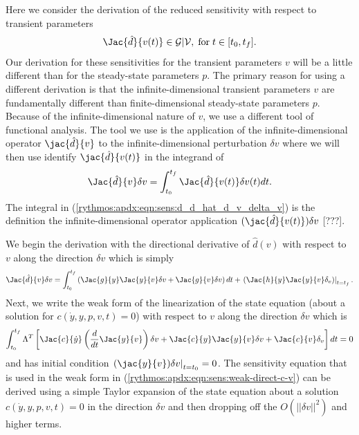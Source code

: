 \documentclass[pdf,ps2pdf,11pt]{SANDreport}
\begin{document}
Here we consider the derivation of the reduced sensitivity with respect to
transient parameters
%
\begin{equation}
\Jac{\hat{d}}{v(t)} \in \mathcal{G}|\mathcal{V}, \; \mbox{for} \; t\in[t_0,t_f].
\end{equation}
%
Our derivation for these sensitivities for the transient parameters $v$ will
be a little different than for the steady-state parameters $p$.  The primary
reason for using a different derivation is that the infinite-dimensional
transient parameters $v$ are fundamentally different than finite-dimensional
steady-state parameters $p$.  Because of the infinite-dimensional nature of
$v$, we use a different tool of functional analysis.  The tool we use is the
application of the infinite-dimensional operator $\jac{\hat{d}}{v}$ to the
infinite-dimensional perturbation $\delta v$ where we will then use identify
$\jac{\hat{d}}{v(t)}$ in the integrand of
%
\begin{equation}
\Jac{\hat{d}}{v} \delta v = \int_{t_0}^{t_f} \Jac{\hat{d}}{v(t)} \delta v(t) dt.
\label{rythmos:apdx:eqn:sens:d_d_hat_d_v_delta_v}
\end{equation}
%
The integral in (\ref{rythmos:apdx:eqn:sens:d_d_hat_d_v_delta_v}) is the
definition the infinite-dimensional operator application
$(\jac{\hat{d}}{v(t)}) {}\delta v$ [???].

We begin the derivation with the directional derivative of $\hat{d}(v)$ with
respect to $v$ along the direction $\delta v$ which is simply
%
\begin{equation}
\Jac{\hat{d}}{v} \delta v
= \int_{t_0}^{t_f} \left( \Jac{g}{y} \Jac{y}{v} \delta v +  \Jac{g}{v} \delta v \right) dt
+ \left. \left(  \Jac{h}{y} \Jac{y}{v} \delta_v \right) \right|_{t=t_f}.
\label{rythmos:apdx:eqn:sens:d_d_hat_d_v_delta_v-2}
\end{equation}
%
Next, we write the weak form of the linearization of the state equation (about
a solution for $c(\dot{y},y,p,v,t)=0$) with respect to $v$ along the direction
$\delta v$ which is
%
\begin{equation}
%
\int_{t_0}^{t_f} \Lambda^T \left[
\Jac{c}{\dot{y}} \left(\frac{d}{dt} \Jac{y}{v} \right) \delta v + \Jac{c}{y} \Jac{y}{v} \delta v
+ \Jac{c}{v} \delta_v \right] dt = 0
\label{rythmos:apdx:eqn:sens:weak-direct-c-v}
\end{equation}
%
and has initial condition $\left.(\jac{y}{v})\delta v\right|_{t=t_0} = 0$.
The sensitivity equation that is used in the weak form in
(\ref{rythmos:apdx:eqn:sens:weak-direct-c-v}) can be derived using a simple
Taylor expansion of the state equation about a solution $c(\dot{y},y,p,v,t)=0$
in the direction $\delta v$ and then dropping off the $O(||\delta v||^2)$ and
higher terms.
\end{document}
